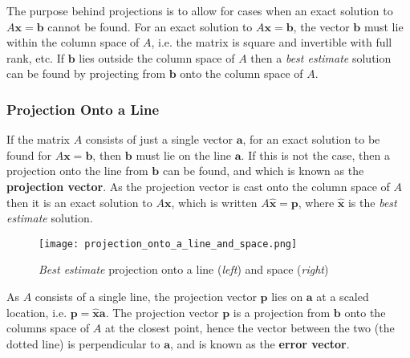             \par \hfill \break
            The purpose behind projections is to allow for cases when an exact solution to \(A\boldsymbol{x} = 
            \boldsymbol{b}\) cannot be found. For an exact solution to \(A\boldsymbol{x} = \boldsymbol{b}\), the vector
            \(\boldsymbol{b}\) must lie within the column space of \(A\), i.e. the matrix is square and invertible with
            full rank, etc. If \(\boldsymbol{b}\) lies outside the column space of \(A\) then a \textit{best estimate}
            solution can be found by projecting from \(\boldsymbol{b}\) onto the column space of \(A\). 

        \subsubsection{Projection Onto a Line}
            If the matrix \(A\) consists of just a single vector \(\boldsymbol{a}\), for an exact solution 
            to be found for \(A\boldsymbol{x} = \boldsymbol{b}\), then \(\boldsymbol{b}\) must lie on the line 
            \(\boldsymbol{a}\). If this is not the case, then a projection onto the line from \(\boldsymbol{b}\) can be
            found, and which is known as the \textbf{projection vector}. As the projection vector is cast onto the 
            column space of \(A\) then it is an exact solution to \(A\boldsymbol{x}\), which is written 
            \(A \boldsymbol{\hat{x}} = \boldsymbol{p}\), where \(\boldsymbol{\hat{x}}\) is the \textit{best estimate} 
            solution.

            \begin{figure}[h]
                \texttt{[image: projection\_onto\_a\_line\_and\_space.png]}
                \centering
                \caption{\textit{Best estimate} projection onto a line (\textit{left}) and space (\textit{right})}
            \end{figure}

            \par \hfill \break
            As \(A\) consists of a single line, the projection vector \(\boldsymbol{p}\) lies on \(\boldsymbol{a}\) 
            at a scaled location, i.e. \(\boldsymbol{p}=\boldsymbol{\hat{x}a}\). The projection vector 
            \(\boldsymbol{p}\) is a projection from \(\boldsymbol{b}\) onto the columns space of \(A\) at the closest 
            point, hence the vector between the two (the dotted line) is perpendicular to \(\boldsymbol{a}\), and is 
            known as the \textbf{error vector}.

